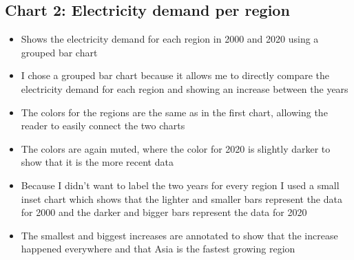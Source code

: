 \documentclass{article}
\begin{document}
\subsection{Chart 2: Electricity demand per region}
\begin{itemize}
    \item Shows the electricity demand for each region in 2000 and 2020 using a grouped bar chart
    \item I chose a grouped bar chart because it allows me to directly compare the electricity demand for each region and showing an increase between the years
    \item The colors for the regions are the same as in the first chart, allowing the reader to easily connect the two charts
    \item The colors are again muted, where the color for 2020 is slightly darker to show that it is the more recent data
    \item Because I didn't want to label the two years for every region I used a small inset chart which shows that the lighter and smaller bars represent the data for 2000 and the darker and bigger bars represent the data for 2020
    \item The smallest and biggest increases are annotated to show that the increase happened everywhere and that Asia is the fastest growing region
\end{itemize}
\end{document}
